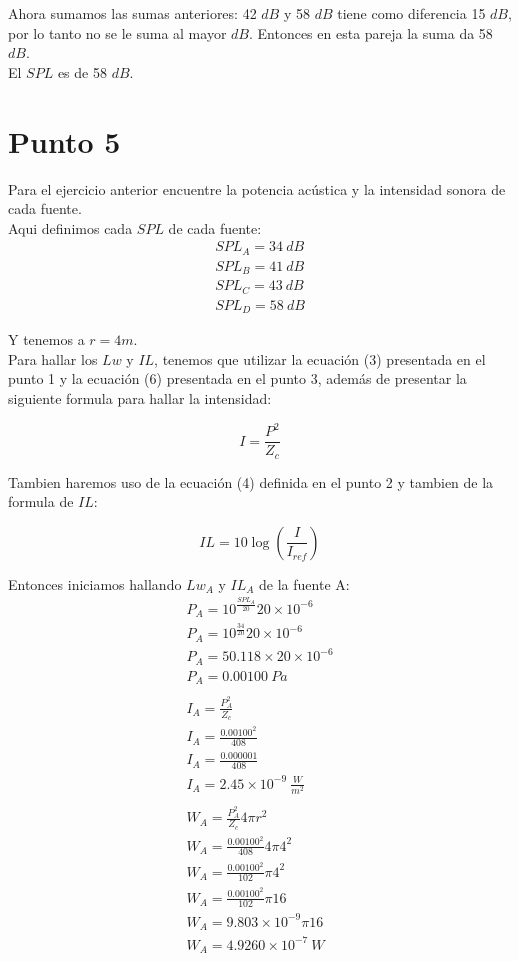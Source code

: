 \documentclass{article}
\begin{document}
Ahora sumamos las sumas anteriores: 42 $dB$ y 58 $dB$ tiene como diferencia 15 $dB$, por lo tanto no se le suma al mayor $dB$. Entonces en esta pareja la suma da 58 $dB$.\\

El $SPL$ es de 58 $dB$.

\section{Punto 5}

Para el ejercicio anterior encuentre la potencia acústica y la intensidad sonora de cada fuente.\\

Aqui definimos cada $SPL$ de cada fuente:
\begin{gather*}
    SPL_A = 34\ dB\\
    SPL_B = 41\ dB\\
    SPL_C = 43\ dB\\
    SPL_D = 58\ dB
\end{gather*}

Y tenemos a $r = 4m$.\\

Para hallar los $Lw$ y $IL$, tenemos que utilizar la ecuación (3) presentada en el punto 1 y la ecuación (6) presentada en el punto 3, además de presentar la siguiente formula para hallar la intensidad:

\begin{equation}
    I = \frac{P^2}{Z_c}
\end{equation}

Tambien haremos uso de la ecuación (4) definida en el punto 2 y tambien de la formula de $IL$:

\begin{equation}
    IL = 10 \log(\frac{I}{I_{ref}})
\end{equation}

Entonces iniciamos hallando $Lw_A$ y $IL_A$ de la fuente A:
\begin{gather*}
    P_A = 10^{\frac{SPL_A}{20}} 20 \times 10^{-6}\\
    P_A = 10^{\frac{34}{20}} 20 \times 10^{-6}\\
    P_A = 50.118 \times 20 \times 10^{-6}\\
    P_A = 0.00100\ Pa\\\\
    I_A = \frac{P_A^2}{Z_c}\\
    I_A = \frac{0.00100^2}{408}\\
    I_A = \frac{0.000001}{408}\\
    I_A = 2.45 \times 10^{-9}\ \frac{W}{m^2}\\\\
    W_A = \frac{P_A^2}{Z_c} 4\pi r^2\\
    W_A = \frac{0.00100^2}{408} 4\pi 4^2\\
    W_A = \frac{0.00100^2}{102} \pi 4^2\\
    W_A = \frac{0.00100^2}{102} \pi 16\\
    W_A = 9.803 \times 10^{-9} \pi 16\\
    W_A = 4.9260 \times 10^{-7}\ W
\end{gather*}
\end{document}
